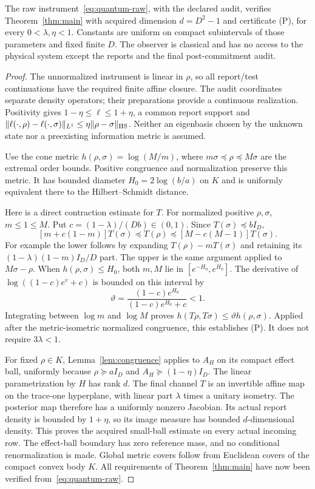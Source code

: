 \begin{theorem}\label{thm:quantum}
The raw instrument~\eqref{eq:quantum-raw}, with the declared audit, verifies Theorem~\ref{thm:main} with acquired dimension $d=D^2-1$ and certificate (P), for every $0<\lambda,\eta<1$. Constants are uniform on compact subintervals of those parameters and fixed finite $D$. The observer is classical and has no access to the physical system except the reports and the final post-commitment audit.
\end{theorem}
\begin{proof}
The unnormalized instrument is linear in $\rho$, so all report/test continuations have the required finite affine closure. The audit coordinates separate density operators; their preparations provide a continuous realization. Positivity gives $1-\eta\le\ell\le1+\eta$, a common report support and
$\|\ell(\cdot,\rho)-\ell(\cdot,\sigma)\|_{L^1}\le\eta\|\rho-\sigma\|_{\rm HS}$. Neither an eigenbasis chosen by the unknown state nor a preexisting information metric is assumed.

Use the cone metric $h(\rho,\sigma)=\log(M/m)$, where $m\sigma\preceq\rho\preceq M\sigma$ are the extremal order bounds. Positive congruence and normalization preserve this metric. It has bounded diameter $H_0=2\log(b/a)$ on $K$ and is uniformly equivalent there to the Hilbert--Schmidt distance.

Here is a direct contraction estimate for $T$. For normalized positive $\rho,\sigma$, $m\le1\le M$. Put $c=(1-\lambda)/(Db)\in(0,1)$. Since $T(\sigma)\preceq bI_D$,
\[
 [m+c(1-m)]T(\sigma)\preceq T(\rho)
 \preceq[M-c(M-1)]T(\sigma).
\]
For example the lower follows by expanding $T(\rho)-mT(\sigma)$ and retaining its $(1-\lambda)(1-m)I_D/D$ part. The upper is the same argument applied to $M\sigma-\rho$. When $h(\rho,\sigma)\le H_0$, both $m,M$ lie in $[e^{-H_0},e^{H_0}]$. The derivative of $\log((1-c)e^v+c)$ is bounded on this interval by
\[
 \vartheta=\frac{(1-c)e^{H_0}}{(1-c)e^{H_0}+c}<1.
\]
Integrating between $\log m$ and $\log M$ proves $h(T\rho,T\sigma)\le\vartheta h(\rho,\sigma)$. Applied after the metric-isometric normalized congruence, this establishes (P). It does not require $3\lambda<1$.

For fixed $\rho\in K$, Lemma~\ref{lem:congruence} applies to $A_H$ on its compact effect ball, uniformly because $\rho\succeq aI_D$ and $A_H\succeq(1-\eta)I_D$. The linear parametrization by $H$ has rank $d$. The final channel $T$ is an invertible affine map on the trace-one hyperplane, with linear part $\lambda$ times a unitary isometry. The posterior map therefore has a uniformly nonzero Jacobian. Its actual report density is bounded by $1+\eta$, so its image measure has bounded $d$-dimensional density. This proves the acquired small-ball estimate on every actual incoming row. The effect-ball boundary has zero reference mass, and no conditional renormalization is made. Global metric covers follow from Euclidean covers of the compact convex body $K$. All requirements of Theorem~\ref{thm:main} have now been verified from~\eqref{eq:quantum-raw}.
\end{proof}

